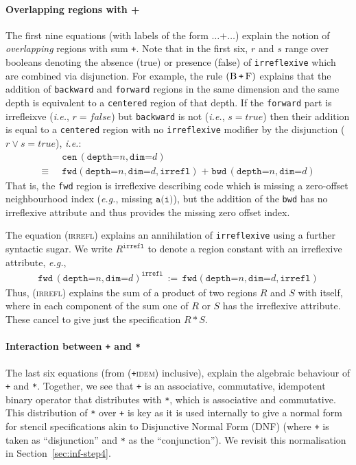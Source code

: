 \documentclass[9pt]{sigplanconf}
\theoremstyle{definition}
\newcommand{\ie}{\emph{i.e.}}
\newcommand{\eg}{\emph{e.g.}}
\newcommand{\term}[1]{\texttt{#1}}
\newcommand{\irrefl}{\texttt{irreflexive}}
\newcommand{\stenFwdS}[2]{\term{fwd} \, (\term{depth=}#1,
  \term{dim=}#2)}
\newcommand{\stenBwdS}[2]{\term{bwd} \, (\term{depth=}#1,
  \term{dim=}#2)}
\newcommand{\stenCenS}[2]{\term{cen} \, (\term{depth=}#1,
  \term{dim=}#2)}
\newcommand{\irreflS}{\texttt{irrefl}}
\newcommand{\stenFwdSR}[3]{\term{fwd} (\term{depth=}#1,
  \term{dim=}#2, #3)}
\begin{document}
\paragraph{Overlapping regions with +}
The first nine
equations (with labels of the form $\ldots \texttt{+} \ldots$)
explain the notion of \emph{overlapping} regions with sum
\term{+}. Note that in the first six, $r$ and $s$ range
over booleans denoting the absence (true) or presence (false)
of \irrefl{} which are combined via disjunction. For example,
the rule $(\textsc{B} \, \term{+} \,
\textsc{F})$ explains that the addition of \term{backward}
and \term{forward} regions in the same dimension and the same
depth is equivalent to a \term{centered} region of that depth.
If the \term{forward} part is irrefleixve (\ie{}, $r =
\textit{false}$) but \term{backward} is not (\ie{}, $s =
\textit{true}$) then their addition is equal to a \term{centered}
region with no \irrefl{} modifier by the disjunction ($r \vee s =
\textit{true}$), \ie{}:
\begin{align*}
& \stenCenS{n}{d}  \\[-0.2em]
\equiv \;\; & \stenFwdSR{n}{d}{\irreflS} \; \texttt{+} \; \stenBwdS{n}{d}
\end{align*}
That is, the \term{fwd} region is irreflexive describing code which is missing
a zero-offset neighbourhood index (\eg{}, missing $\texttt{a(i)}$), but the addition of
the \term{bwd} has no irreflexive attribute and thus provides the
missing zero offset index.

The equation (\textsc{irrefl}) explains an annihilation of
\irrefl{} using a further syntactic sugar.
We write $R^{\irreflS}$ to denote a region constant with an
irreflexive attribute, \eg{},
\begin{align*}
\stenFwdS{n}{d}^{\irreflS} \, := \,
\stenFwdSR{n}{d}{\irreflS}
\end{align*}
Thus, (\textsc{irrefl}) explains the sum of a
product of two regions $R$ and $S$ with itself,
where in each component of the sum one of $R$
or $S$ has the irreflexive attribute. These cancel to give
just the specification $R \, \term{*} \, S$.


\paragraph{Interaction between \term{+} and \term{*}}

The last six equations (from (\textsc{\term{+}idem}) inclusive), explain
the algebraic behaviour of \term{+} and \term{*}.  Together, we see
that \term{+} is an associative, commutative, idempotent binary
operator that distributes with \term{*}, which is associative and
commutative. This distribution of \term{*} over \term{+} is key as it
is used internally to give a normal form for stencil specifications
akin to Disjunctive Normal Form (DNF) (where \term{+} is taken as
``disjunction'' and \term{*} as the ``conjunction''). We revisit this
normalisation in Section~\ref{sec:inf-step4}.
\end{document}
